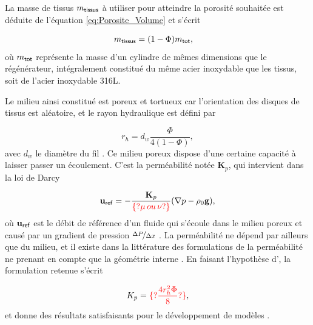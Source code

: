 La masse de tissus $m_{\sf tissus}$ à utiliser pour atteindre la porosité souhaitée est déduite de l'équation \eqref{eq:Porosite_Volume} et s'écrit 

\begin{align}
	m_{\sf tissus} &= (1-\Phi) m_{\sf tot}, \label{eq:MasseTissus_Porosite}
\end{align}
où $m_{\sf tot}$ représente la masse d'un cylindre de mêmes dimensions que le régénérateur, intégralement constitué du même acier inoxydable que les tissus, soit de l'acier inoxydable 316L.

Le milieu ainsi constitué est poreux et tortueux car l'orientation des disques de tissus est aléatoire, et le rayon hydraulique est défini par  %

\begin{equation}
	r_h = d_w\frac{\Phi}{4(1-\Phi)},
	\label{eq:DefRayonHydrauGantois}
\end{equation}
avec $d_w$ le diamètre du fil \cite{swift_thermoacoustics_2017}. Ce milieu poreux dispose d'une certaine capacité à laisser passer un écoulement. C'est la perméabilité notée $\mathbf K_p$, qui intervient dans la loi de Darcy

\begin{equation}
	\mathbf u_{\sf ref} = -\frac{\mathbf K_p}{\textcolor{red}{\{?\mu\,ou\,\nu?\}}} (\nabla p - \rho_0 \mathbf g),
	\label{eq:DefPermeabilite_Wikipedia}
\end{equation}
où $\mathbf u_{\sf ref}$ est le débit de référence d'un fluide qui s'écoule dans le milieu poreux et causé par un gradient de pression $\nicefrac{\Delta P}{\Delta x}$ \cite{nield_convection_2013}. La perméabilité ne dépend par ailleurs que du milieu, et il existe dans la littérature des formulations de la perméabilité ne prenant en compte que la géométrie interne \cite{dullien_porous_1992}. En faisant l'hypothèse d', la formulation retenue s'écrit

\begin{equation}
	K_p = \textcolor{red}{\{?\frac{4 r_h^2 \Phi}{8}?\}},
	\label{eq:DefPermeabilite_LISN}
\end{equation}
et donne des résultats satisfaisants pour le développement de modèles \cite{hireche_experimental_2020, baltean_gravity_2025}.\bigskip

